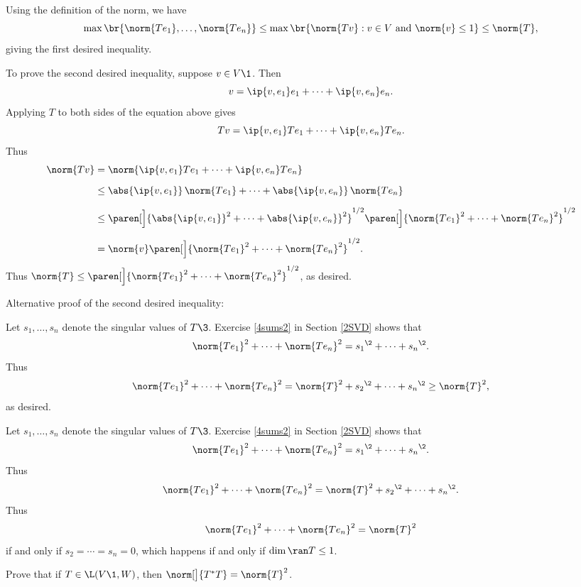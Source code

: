 \begin{Solution}
\begin{subtheorem}
\item
Using the definition of the norm, we have
\[
\max\br{ \norm{Te_1}, \ldots, \norm{Te_n} } \le \max\br{\norm{Tv}: v \in V \text{ and } \norm{v} \le 1} \le \norm{T},
\]
giving the first desired inequality.

To prove the second desired inequality, suppose $v \in V\1$. Then
\[
v = \ip{v,e_1} e_1 + \cdots + \ip{v, e_n} e_n.
\]
Applying $T$ to both sides of the equation above gives
\[
Tv = \ip{v,e_1} Te_1 + \cdots + \ip{v, e_n} Te_n.
\]
Thus
\begin{align*}
\norm{Tv} &= \norm{ \ip{v,e_1} Te_1 + \cdots + \ip{v, e_n} Te_n } \\[6bp]
&\le \abs{\ip{v, e_1}} \, \norm{Te_1} + \cdots + \abs{\ip{v, e_n}} \, \norm{Te_n} \\[6bp]
&\le \paren[\Big]{ \abs{\ip{v, e_1}}^2 + \cdots + \abs{\ip{v, e_n}}^2}^{1/2}
      \paren[\Big]{ \norm{Te_1}^2 + \cdots + \norm{Te_n}^2 }^{1/2}\\[6bp]
&= \norm{v} \paren[\Big]{ \norm{Te_1}^2 + \cdots + \norm{Te_n}^2 }^{1/2}.
\end{align*}
Thus $\norm{T} \le \paren[\Big]{ \norm{Te_1}^2 + \cdots + \norm{Te_n}^2 }^{1/2}$, as desired.

Alternative proof of the second desired inequality:

Let $s_1, \ldots, s_n$ denote the singular values of $T\3$. Exercise \ref{4sums2} in Section \ref{2SVD} shows that
\[
\norm{Te_1}^2 + \cdots + \norm{Te_n}^2 = {s_1}^{\2} + \cdots + {s_n}^{\2}.
\]
Thus
\[
\norm{Te_1}^2 + \cdots + \norm{Te_n}^2 = \norm{T}^2 +{s_2}^{\2} + \cdots + {s_n}^{\2} \ge \norm{T}^2,
\]
as desired.

\item
Let $s_1, \ldots, s_n$ denote the singular values of $T\3$. Exercise \ref{4sums2} in Section \ref{2SVD} shows that
\[
\norm{Te_1}^2 + \cdots + \norm{Te_n}^2 = {s_1}^{\2} + \cdots + {s_n}^{\2}.
\]
Thus
\[
\norm{Te_1}^2 + \cdots + \norm{Te_n}^2 = \norm{T}^2 +{s_2}^{\2} + \cdots + {s_n}^{\2}.
\]
Thus
\[
\norm{Te_1}^2 + \cdots + \norm{Te_n}^2 = \norm{T}^2
\]
if and only if $s_2 = \cdots = s_n = 0$, which happens if and only if $\dim \ran T \le 1$.
\end{subtheorem}
\end{Solution}

\exercise
Prove that if $T \in \L(V\1, W)$, then  $\norm[\big]{T^*T} = \norm{T}^2$.\label{8Cstar}

